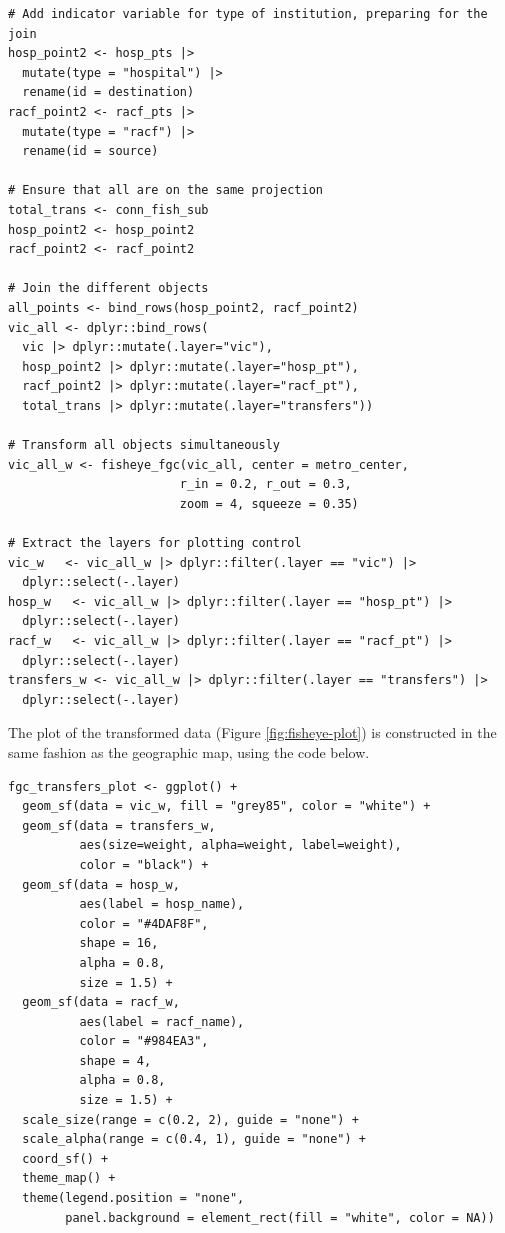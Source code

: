 \begin{verbatim}
# Add indicator variable for type of institution, preparing for the join
hosp_point2 <- hosp_pts |>
  mutate(type = "hospital") |>
  rename(id = destination)
racf_point2 <- racf_pts |>
  mutate(type = "racf") |>
  rename(id = source)

# Ensure that all are on the same projection
total_trans <- conn_fish_sub 
hosp_point2 <- hosp_point2 
racf_point2 <- racf_point2 

# Join the different objects
all_points <- bind_rows(hosp_point2, racf_point2)
vic_all <- dplyr::bind_rows(
  vic |> dplyr::mutate(.layer="vic"),
  hosp_point2 |> dplyr::mutate(.layer="hosp_pt"),
  racf_point2 |> dplyr::mutate(.layer="racf_pt"),
  total_trans |> dplyr::mutate(.layer="transfers"))

# Transform all objects simultaneously
vic_all_w <- fisheye_fgc(vic_all, center = metro_center, 
                        r_in = 0.2, r_out = 0.3, 
                        zoom = 4, squeeze = 0.35)

# Extract the layers for plotting control
vic_w   <- vic_all_w |> dplyr::filter(.layer == "vic") |> 
  dplyr::select(-.layer)
hosp_w   <- vic_all_w |> dplyr::filter(.layer == "hosp_pt") |>
  dplyr::select(-.layer)
racf_w   <- vic_all_w |> dplyr::filter(.layer == "racf_pt") |>
  dplyr::select(-.layer)
transfers_w <- vic_all_w |> dplyr::filter(.layer == "transfers") |>
  dplyr::select(-.layer)
\end{verbatim}

The plot of the transformed data (Figure \ref{fig:fisheye-plot}) is constructed in the same fashion as the geographic map, using the code below.

\begin{verbatim}
fgc_transfers_plot <- ggplot() +
  geom_sf(data = vic_w, fill = "grey85", color = "white") +
  geom_sf(data = transfers_w, 
          aes(size=weight, alpha=weight, label=weight), 
          color = "black") +
  geom_sf(data = hosp_w, 
          aes(label = hosp_name),           
          color = "#4DAF8F", 
          shape = 16,
          alpha = 0.8,
          size = 1.5) +
  geom_sf(data = racf_w, 
          aes(label = racf_name), 
          color = "#984EA3", 
          shape = 4,
          alpha = 0.8,
          size = 1.5) +
  scale_size(range = c(0.2, 2), guide = "none") +
  scale_alpha(range = c(0.4, 1), guide = "none") + 
  coord_sf() +
  theme_map() +
  theme(legend.position = "none", 
        panel.background = element_rect(fill = "white", color = NA))
\end{verbatim}

